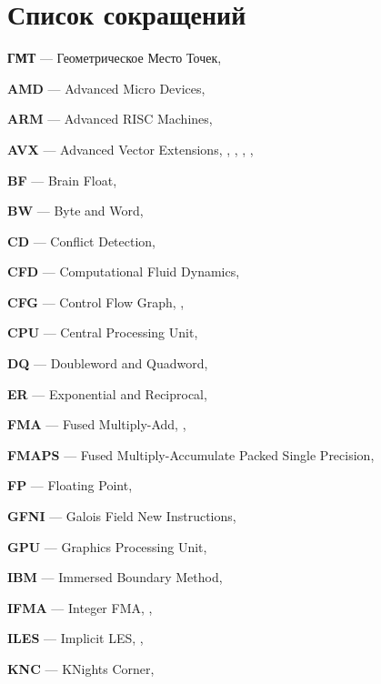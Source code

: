 \newpage

\section*{Список сокращений}

\textbf{ГМТ} --- Геометрическое Место Точек, \pageref{abbr:gmt}

\textbf{AMD} --- Advanced Micro Devices, \pageref{abbr:amd}

\textbf{ARM} --- Advanced RISC Machines, \pageref{abbr:arm}

\textbf{AVX} --- Advanced Vector Extensions, \pageref{abbr:avx}, \pageref{abbr:avx2}, \pageref{abbr:avx3}, \pageref{abbr:avx4}, \pageref{abbr:avx5}

\textbf{BF} --- Brain Float, \pageref{abbr:bf}

\textbf{BW} --- Byte and Word, \pageref{abbr:bw}

\textbf{CD} --- Conflict Detection, \pageref{abbr:cd}

\textbf{CFD} --- Computational Fluid Dynamics, \pageref{abbr:cfd}

\textbf{CFG} --- Control Flow Graph, \pageref{abbr:cfg}, \pageref{abbr:cfg2}

\textbf{CPU} --- Central Processing Unit, \pageref{abbr:cpu}

\textbf{DQ} --- Doubleword and Quadword, \pageref{abbr:dq}

\textbf{ER} --- Exponential and Reciprocal, \pageref{abbr:er}

\textbf{FMA} --- Fused Multiply-Add, \pageref{abbr:fma}, \pageref{abbr:fma2}

\textbf{FMAPS} --- Fused Multiply-Accumulate Packed Single Precision, \pageref{abbr:fmaps}
 
\textbf{FP} --- Floating Point, \pageref{abbr:fp}

\textbf{GFNI} --- Galois Field New Instructions, \pageref{abbr:gfni}

\textbf{GPU} --- Graphics Processing Unit, \pageref{abbr:gpu}

\textbf{IBM} --- Immersed Boundary Method, \pageref{abbr:ibm}

\textbf{IFMA} --- Integer FMA, \pageref{abbr:ifma}, \pageref{abbr:ifma2}

\textbf{ILES} --- Implicit LES, \pageref{abbr:iles}, \pageref{abbr:iles2}

\textbf{KNC} --- KNights Corner, \pageref{abbr:knc}

